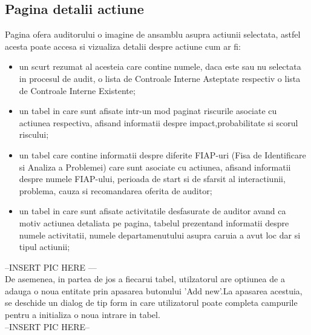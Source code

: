 \subsection{Pagina detalii actiune}
Pagina ofera auditorului o imagine de ansamblu asupra actiunii selectata, astfel acesta poate accesa si vizualiza detalii despre actiune cum ar fi:\\
\begin{itemize}
	\item un scurt rezumat al acesteia care contine numele, daca este sau nu selectata in procesul de audit, o lista de Controale Interne Asteptate respectiv o lista de Controale Interne Existente;
	
	\item  un tabel in care sunt afisate intr-un mod paginat riscurile asociate cu actiunea respectiva, afisand informatii despre impact,probabilitate si scorul riscului;
	
	\item  un tabel care contine informatii despre diferite FIAP-uri (Fisa de Identificare si Analiza a Problemei) care sunt asociate cu actiunea, afisand informatii despre numele FIAP-ului, perioada de start si de sfarsit al interactiunii, problema, cauza si recomandarea oferita de auditor;
	
	\item  un tabel  in care sunt afisate activitatile desfasurate de auditor avand ca motiv actiunea detaliata pe pagina, tabelul prezentand informatii despre numele activitatii, numele departamenutului asupra caruia a avut loc dar si tipul actiunii;
	
\end{itemize}

--INSERT PIC HERE ---\\
De asemenea, in partea de jos a fiecarui tabel, utilzatorul are optiunea de a adauga o noua entitate prin apasarea butonului 'Add new'.La apasarea acestuia, se deschide un dialog de tip 
form in care utilizatorul poate completa campurile pentru a initializa o noua intrare in tabel.\\

--INSERT PIC HERE--\\
 
 





